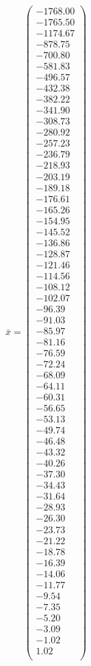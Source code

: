 \documentclass[a4paper,12pt]{article}
\begin{document}
$\bar { x } = \begin{pmatrix}
-1768.00 \\
-1765.50 \\
-1174.67 \\
-878.75 \\
-700.80 \\
-581.83 \\
-496.57 \\
-432.38 \\
-382.22 \\
-341.90 \\
-308.73 \\
-280.92 \\
-257.23 \\
-236.79 \\
-218.93 \\
-203.19 \\
-189.18 \\
-176.61 \\
-165.26 \\
-154.95 \\
-145.52 \\
-136.86 \\
-128.87 \\
-121.46 \\
-114.56 \\
-108.12 \\
-102.07 \\
-96.39 \\
-91.03 \\
-85.97 \\
-81.16 \\
-76.59 \\
-72.24 \\
-68.09 \\
-64.11 \\
-60.31 \\
-56.65 \\
-53.13 \\
-49.74 \\
-46.48 \\
-43.32 \\
-40.26 \\
-37.30 \\
-34.43 \\
-31.64 \\
-28.93 \\
-26.30 \\
-23.73 \\
-21.22 \\
-18.78 \\
-16.39 \\
-14.06 \\
-11.77 \\
-9.54 \\
-7.35 \\
-5.20 \\
-3.09 \\
-1.02 \\
1.02 \\
\end{pmatrix}
$
\end{document}
